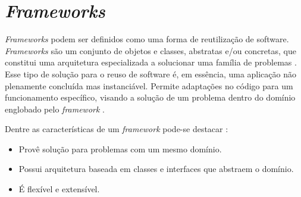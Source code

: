\section{\textit{Frameworks}}
\textit{Frameworks} podem ser definidos como uma forma de reutilização de software. \textit{Frameworks} são um conjunto de objetos e classes, abstratas e/ou concretas, que constitui uma arquitetura especializada a solucionar uma família de problemas \cite{barretoJunior2006}. Esse tipo de solução para o reuso de software é, em essência, uma aplicação não plenamente concluída mas instanciável. Permite adaptações no código para um funcionamento específico, visando a solução de um problema dentro do domínio englobado pelo \textit{framework} \cite{barretoJunior2006}.
\par
\indent Dentre as características de um \textit{framework} pode-se destacar \cite{sauve2006}:
\begin{itemize}
\item Provê solução para problemas com um mesmo domínio.
\item Possui arquitetura baseada em classes e interfaces que abstraem o domínio.
\item É flexível e extensível.
\end{itemize}
\par

